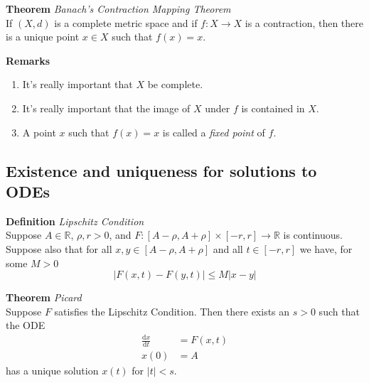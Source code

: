 \documentclass[8pt,landscape]{article}
\begin{document}
\begin{multicols}{3}
\textbf{Theorem} \emph{Banach's Contraction Mapping Theorem} \\
If $(X, d)$ is a complete metric space and if $f : X \to X$ is a contraction,
then there is a unique point $x \in X$ such that $f(x) = x$.

\textbf{Remarks}
\begin{enumerate}
    \item It's really important that $X$ be complete.
    \item It's really important that the image of $X$ under $f$ is contained in $X$.
    \item A point $x$ such that $f(x) = x$ is called a \emph{fixed point} of $f$.
\end{enumerate}

\subsection{Existence and uniqueness for solutions to ODEs}

\textbf{Definition} \emph{Lipschitz Condition} \\
Suppose $A \in \mathbb{R}$, $\rho, r > 0$, and
$F : [A - \rho, A + \rho] \times [-r, r] \to \mathbb{R}$ is continuous.
Suppose also that for all $x, y \in [A - \rho, A + \rho]$ and all $t \in [-r, r]$
we have, for some $M > 0$
\[
    | F(x, t) - F(y, t) | \leq M|x-y|
\]

\textbf{Theorem} \emph{Picard} \\
Suppose $F$ satisfies the Lipschitz Condition.
Then there exists an $s > 0$ such that the ODE
\begin{align*}{}
    \frac{\mathrm{d}x}{\mathrm{d}t} &= F(x, t) \\
    x(0) &= A
\end{align*}
has a unique solution $x(t)$ for $|t| < s$.

\end{multicols}
\end{document}
